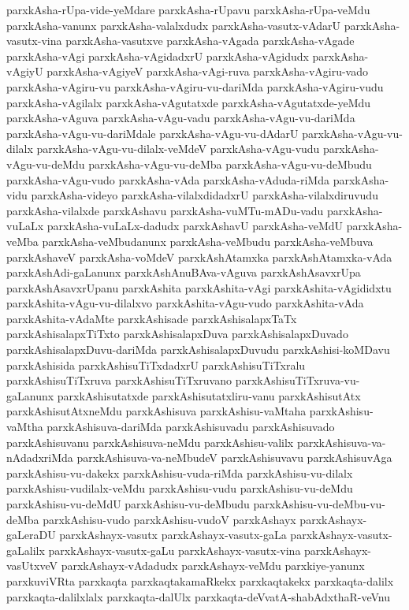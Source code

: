 {parxkAsha-rUpa-vide-yeMdare
parxkAsha-rUpavu
parxkAsha-rUpa-veMdu
parxkAsha-vanunx
parxkAsha-valalxdudx
parxkAsha-vasutx-vAdarU
parxkAsha-vasutx-vina
parxkAsha-vasutxve
parxkAsha-vAgada
parxkAsha-vAgade
parxkAsha-vAgi
parxkAsha-vAgidadxrU
parxkAsha-vAgidudx
parxkAsha-vAgiyU
parxkAsha-vAgiyeV
parxkAsha-vAgi-ruva
parxkAsha-vAgiru-vado
parxkAsha-vAgiru-vu
parxkAsha-vAgiru-vu-dariMda
parxkAsha-vAgiru-vudu
parxkAsha-vAgilalx
parxkAsha-vAgutatxde
parxkAsha-vAgutatxde-yeMdu
parxkAsha-vAguva
parxkAsha-vAgu-vadu
parxkAsha-vAgu-vu-dariMda
parxkAsha-vAgu-vu-dariMdale
parxkAsha-vAgu-vu-dAdarU
parxkAsha-vAgu-vu-dilalx
parxkAsha-vAgu-vu-dilalx-veMdeV
parxkAsha-vAgu-vudu
parxkAsha-vAgu-vu-deMdu
parxkAsha-vAgu-vu-deMba
parxkAsha-vAgu-vu-deMbudu
parxkAsha-vAgu-vudo
parxkAsha-vAda
parxkAsha-vAduda-riMda
parxkAsha-vidu
parxkAsha-videyo
parxkAsha-vilalxdidadxrU
parxkAsha-vilalxdiruvudu
parxkAsha-vilalxde
parxkAshavu
parxkAsha-vuMTu-mADu-vadu
parxkAsha-vuLaLx
parxkAsha-vuLaLx-dadudx
parxkAshavU
parxkAsha-veMdU
parxkAsha-veMba
parxkAsha-veMbudanunx
parxkAsha-veMbudu
parxkAsha-veMbuva
parxkAshaveV
parxkAsha-voMdeV
parxkAshAtamxka
parxkAshAtamxka-vAda
parxkAshAdi-gaLanunx
parxkAshAnuBAva-vAguva
parxkAshAsavxrUpa
parxkAshAsavxrUpanu
parxkAshita
parxkAshita-vAgi
parxkAshita-vAgididxtu
parxkAshita-vAgu-vu-dilalxvo
parxkAshita-vAgu-vudo
parxkAshita-vAda
parxkAshita-vAdaMte
parxkAshisade
parxkAshisalapxTaTx
parxkAshisalapxTiTxto
parxkAshisalapxDuva
parxkAshisalapxDuvado
parxkAshisalapxDuvu-dariMda
parxkAshisalapxDuvudu
parxkAshisi-koMDavu
parxkAshisida
parxkAshisuTiTxdadxrU
parxkAshisuTiTxralu
parxkAshisuTiTxruva
parxkAshisuTiTxruvano
parxkAshisuTiTxruva-vu-gaLanunx
parxkAshisutatxde
parxkAshisutatxliru-vanu
parxkAshisutAtx
parxkAshisutAtxneMdu
parxkAshisuva
parxkAshisu-vaMtaha
parxkAshisu-vaMtha
parxkAshisuva-dariMda
parxkAshisuvadu
parxkAshisuvado
parxkAshisuvanu
parxkAshisuva-neMdu
parxkAshisu-valilx
parxkAshisuva-va-nAdadxriMda
parxkAshisuva-va-neMbudeV
parxkAshisuvavu
parxkAshisuvAga
parxkAshisu-vu-dakekx
parxkAshisu-vuda-riMda
parxkAshisu-vu-dilalx
parxkAshisu-vudilalx-veMdu
parxkAshisu-vudu
parxkAshisu-vu-deMdu
parxkAshisu-vu-deMdU
parxkAshisu-vu-deMbudu
parxkAshisu-vu-deMbu-vu-deMba
parxkAshisu-vudo
parxkAshisu-vudoV
parxkAshayx
parxkAshayx-gaLeraDU
parxkAshayx-vasutx
parxkAshayx-vasutx-gaLa
parxkAshayx-vasutx-gaLalilx
parxkAshayx-vasutx-gaLu
parxkAshayx-vasutx-vina
parxkAshayx-vasUtxveV
parxkAshayx-vAdadudx
parxkAshayx-veMdu
parxkiye-yanunx
parxkuviVRta
parxkaqta
parxkaqtakamaRkekx
parxkaqtakekx
parxkaqta-dalilx
parxkaqta-dalilxlalx
parxkaqta-dalUlx
parxkaqta-deVvatA-shabAdxthaR-veVnu
}
